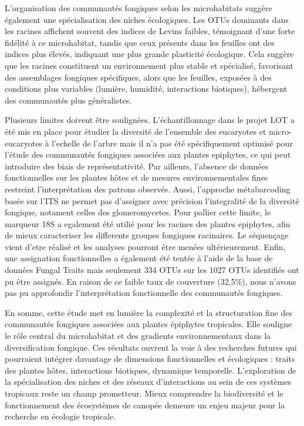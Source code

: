 \documentclass[a4paper,12pt]{article}
\begin{document}
L'organisation des communautés fongiques selon les microhabitats suggère également une spécialisation des niches écologiques. Les OTUs dominants dans les racines affichent souvent des indices de Levins faibles, témoignant d’une forte fidélité à ce microhabitat, tandis que ceux présents dans les feuilles ont des indices plus élevés, indiquant une plus grande plasticité écologique. Cela suggère que les racines constituent un environnement plus stable et spécialisé, favorisant des assemblages fongiques spécifiques, alors que les feuilles, exposées à des conditions plus variables (lumière, humidité, interactions biotiques), hébergent des communautés plus généralistes.

Plusieurs limites doivent être soulignées. L’échantillonnage dans le projet LOT a été mis en place pour étudier la diversité de l’ensemble des eucaryotes et micro-eucaryotes à l’echelle de l’arbre mais il n’a pas été spécifiquement optimisé pour l’étude des communautés fongiques associées aux plantes epiphytes, ce qui peut introduire des biais de représentativité. Par ailleurs, l’absence de données fonctionnelles sur les plantes hôtes et de mesures environnementales fines restreint l’interprétation des patrons observés. Aussi, l’approche métabarcoding basée sur l’ITS ne permet pas d’assigner avec précision l’integralité de la diversité fongique, notament celles des glomeromycetes. Pour pallier cette limite, le marqueur 18S a egalement été utilié pour les racines des plantes epiphytes, afin de mieux caracteriser les differents groupes fongiques racinaires. Le séquençage vient d’etre réalisé et les analyses pourront être menées ultérieurement. Enfin, une assignation fonctionnelles a également été tentée à l’aide de la  base de données Fungal Traits mais seulement 334 OTUs sur les 1027 OTUs identifiés ont pu être assignés. En raison de ce faible taux de couverture (32,5\%), nous n’avons pas pu approfondir l'interprétation fonctionnelle des communautés fongiques.

En somme, cette étude met en lumière la complexité et la structuration fine des communautés fongiques associées aux plantes épiphytes tropicales. Elle souligne le rôle central du microhabitat et des gradients environnementaux dans la diversification fongique. Ces résultats ouvrent la voie à des recherches futures qui pourraient intégrer davantage de dimensions fonctionnelles et écologiques : traits des plantes hôtes, interactions biotiques, dynamique temporelle. L’exploration de la spécialisation des niches et des réseaux d’interactions au sein de ces systèmes tropicaux reste un champ prometteur.
Mieux comprendre la biodiversité et le fonctionnement des écosystèmes de canopée demeure un enjeu majeur pour la recherche en écologie tropicale.
\end{document}
